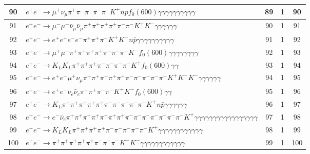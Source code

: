 \documentclass[landscape]{article}
\begin{document}
\begin{table}[htbp!]
\begin{tabular}{|c|>{\centering}p{18cm}|c|c|c|}
\hline
90 & $ e^{+} e^{-} \rightarrow \mu^{+} \nu_{\mu} \pi^{+} \pi^{-} \pi^{-} \pi^{-} \pi^{-} K^{+} \bar{n} p f_{0}(600) \gamma \gamma \gamma \gamma \gamma \gamma \gamma \gamma \gamma \gamma $ & 89 & 1 & 90 \\
\hline
91 & $ e^{+} e^{-} \rightarrow \mu^{-} \mu^{-} \bar{\nu}_{\mu} \bar{\nu}_{\mu} \pi^{+} \pi^{+} \pi^{+} \pi^{+} \pi^{-} \pi^{-} K^{+} K^{-} \gamma \gamma \gamma \gamma \gamma \gamma $ & 90 & 1 & 91 \\
\hline
92 & $ e^{+} e^{-} \rightarrow e^{+} e^{+} e^{-} e^{-} \pi^{+} \pi^{+} \pi^{-} K^{+} K^{-} n \bar{p} \gamma \gamma \gamma \gamma \gamma \gamma \gamma \gamma \gamma \gamma $ & 91 & 1 & 92 \\
\hline
93 & $ e^{+} e^{-} \rightarrow \mu^{+} \mu^{-} \pi^{+} \pi^{+} \pi^{+} \pi^{+} \pi^{-} \pi^{-} \pi^{-} K^{-} f_{0}(600) \gamma \gamma \gamma \gamma \gamma \gamma \gamma \gamma $ & 92 & 1 & 93 \\
\hline
94 & $ e^{+} e^{-} \rightarrow K_{L} K_{L} \pi^{+} \pi^{+} \pi^{+} \pi^{-} \pi^{-} \pi^{-} \pi^{-} K^{+} f_{0}(600) \gamma \gamma $ & 93 & 1 & 94 \\
\hline
95 & $ e^{+} e^{-} \rightarrow e^{+} e^{-} \mu^{+} \nu_{\mu} \pi^{+} \pi^{+} \pi^{+} \pi^{+} \pi^{+} \pi^{-} \pi^{-} \pi^{-} \pi^{-} \pi^{-} K^{+} K^{-} K^{-} \gamma \gamma \gamma \gamma \gamma \gamma $ & 94 & 1 & 95 \\
\hline
96 & $ e^{+} e^{-} \rightarrow e^{+} e^{-} \nu_{e} \bar{\nu}_{e} \pi^{+} \pi^{+} \pi^{-} \pi^{-} K^{+} K^{-} f_{0}(600) \gamma \gamma $ & 95 & 1 & 96 \\
\hline
97 & $ e^{+} e^{-} \rightarrow K_{L} \pi^{+} \pi^{+} \pi^{+} \pi^{+} \pi^{+} \pi^{-} \pi^{-} \pi^{-} \pi^{-} \pi^{-} K^{+} n \bar{p} \gamma \gamma \gamma \gamma \gamma \gamma $ & 96 & 1 & 97 \\
\hline
98 & $ e^{+} e^{-} \rightarrow e^{-} \bar{\nu}_{e} \pi^{+} \pi^{+} \pi^{+} \pi^{+} \pi^{+} \pi^{+} \pi^{+} \pi^{-} \pi^{-} \pi^{-} \pi^{-} \pi^{-} \pi^{-} \pi^{-} K^{+} \gamma \gamma \gamma \gamma \gamma \gamma \gamma \gamma \gamma \gamma \gamma \gamma \gamma \gamma \gamma \gamma \gamma $ & 97 & 1 & 98 \\
\hline
99 & $ e^{+} e^{-} \rightarrow K_{L} K_{L} \pi^{+} \pi^{+} \pi^{+} \pi^{+} \pi^{-} \pi^{-} \pi^{-} \pi^{-} \pi^{-} K^{+} \gamma \gamma \gamma \gamma \gamma \gamma \gamma \gamma \gamma \gamma \gamma \gamma $ & 98 & 1 & 99 \\
\hline
100 & $ e^{+} e^{-} \rightarrow \pi^{+} \pi^{+} \pi^{+} \pi^{+} \pi^{+} \pi^{-} \pi^{-} \pi^{-} K^{-} K^{-} \gamma \gamma \gamma \gamma \gamma \gamma \gamma \gamma \gamma \gamma \gamma \gamma $ & 99 & 1 & 100 \\

\end{tabular}
\end{table}
\end{document}
